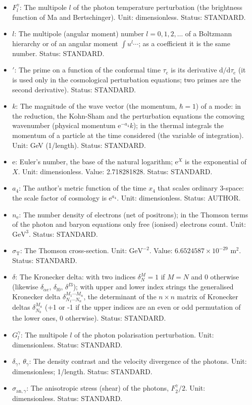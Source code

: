 \documentclass[
  10pt,
]{article}
\providecommand{\tightlist}{%
  \setlength{\itemsep}{0pt}\setlength{\parskip}{0pt}}
\begin{document}
\begin{itemize}
\tightlist
\item
  \(F^\gamma_l\): The multipole \(l\) of the photon temperature
  perturbation (the brightness function of Ma and Bertschinger). Unit:
  dimensionless. Status: STANDARD.
\item
  \(l\): The multipole (angular moment) number \(l = 0, 1, 2, \dots\) of
  a Boltzmann hierarchy or of an angular moment \(\int u^l\cdots\); as a
  coefficient it is the same number. Status: STANDARD.
\item
  \({}'\): The prime on a function of the conformal time
  \(\tau_{\mathrm{c}}\) is its derivative
  \(\mathrm{d}/\mathrm{d}\tau_{\mathrm{c}}\) (it is used only in the
  cosmological perturbation equations; two primes are the second
  derivative). Status: STANDARD.
\item
  \(k\): The magnitude of the wave vector (the momentum, \(\hbar = 1\))
  of a mode: in the reduction, the Kohn-Sham and the perturbation
  equations the comoving wavenumber (physical momentum
  \(\mathrm{e}^{-a_4}k\)); in the thermal integrals the momentum of a
  particle at the time considered (the variable of integration). Unit:
  GeV (1/length). Status: STANDARD.
\item
  \(\mathrm{e}\): Euler's number, the base of the natural logarithm;
  \(\mathrm{e}^{X}\) is the exponential of \(X\). Unit: dimensionless.
  Value: 2.718281828. Status: STANDARD.
\item
  \(a_4\): The author's metric function of the time \(x_4\) that scales
  ordinary 3-space: the scale factor of cosmology is
  \(\mathrm{e}^{a_4}\). Unit: dimensionless. Status: AUTHOR.
\item
  \(n_{\mathrm{e}}\): The number density of electrons (net of
  positrons); in the Thomson terms of the photon and baryon equations
  only free (ionised) electrons count. Unit: \(\mathrm{GeV}^{3}\).
  Status: STANDARD.
\item
  \(\sigma_{\mathrm{T}}\): The Thomson cross-section. Unit:
  \(\mathrm{GeV}^{-2}\). Value: \(6.6524587\times10^{-29}\) m\(^2\).
  Status: STANDARD.
\item
  \(\delta\): The Kronecker delta: with two indices \(\delta^M_N = 1\)
  if \(M = N\) and 0 otherwise (likewise \(\delta_{\alpha e}\),
  \(\delta_{l0}\), \(\delta^{I3}\)); with upper and lower index strings
  the generalised Kronecker delta
  \(\delta^{M_1\cdots M_n}_{N_1\cdots N_n}\), the determinant of the
  \(n \times n\) matrix of Kronecker deltas \(\delta^{M_a}_{N_b}\) (+1
  or -1 if the upper indices are an even or odd permutation of the lower
  ones, 0 otherwise). Status: STANDARD.
\item
  \(G^\gamma_l\): The multipole \(l\) of the photon polarisation
  perturbation. Unit: dimensionless. Status: STANDARD.
\item
  \(\delta_\gamma,\ \theta_\gamma\): The density contrast and the
  velocity divergence of the photons. Unit: dimensionless; 1/length.
  Status: STANDARD.
\item
  \(\sigma_{\mathrm{an},\gamma}\): The anisotropic stress (shear) of the
  photons, \(F^\gamma_2/2\). Unit: dimensionless. Status: STANDARD.
\end{itemize}
\end{document}

